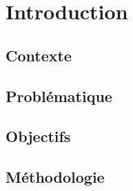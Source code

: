 \chapter{Introduction}


\section{Contexte}


\section{Problématique}


\section{Objectifs}


\section{Méthodologie}

